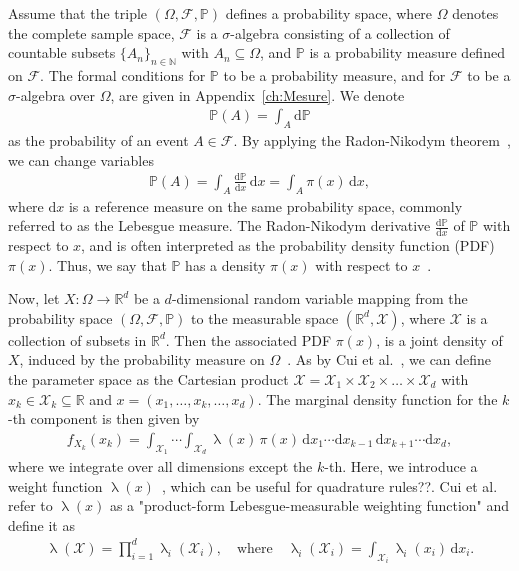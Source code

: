 Assume that the triple $(\Omega, \mathcal{F}, \mathbb{P})$ defines a probability space, where $\Omega$ denotes the complete sample space, $\mathcal{F}$ is a $\sigma$-algebra consisting of a collection of countable subsets $\{A_n\}_{n \in \mathbb{N}}$ with $A_n \subseteq \Omega$, and $\mathbb{P}$ is a probability measure defined on $\mathcal{F}$. The formal conditions for $\mathbb{P}$ to be a probability measure, and for $\mathcal{F}$ to be a $\sigma$-algebra over $\Omega$, are given in Appendix~\ref{ch:Mesure}.
We denote
\begin{align}
	\mathbb{P}(A) = \int_A \mathrm{d} \mathbb{P}
\end{align}
as the probability of an event $A \in \mathcal{F}$.
By applying the Radon-Nikodym theorem~\cite{kopp2004measintprob}, we can change variables
\begin{align}
	\mathbb{P}(A) = \int_A \frac{\mathrm{d} \mathbb{P}}{\mathrm{d}x} \, \mathrm{d}x = \int_A \pi(x) \, \mathrm{d}x,
\end{align}
where $\mathrm{d}x$ is a reference measure on the same probability space, commonly referred to as the Lebesgue measure. 
The Radon-Nikodym derivative $\frac{\mathrm{d} \mathbb{P}}{\mathrm{d}x}$ of $\mathbb{P}$ with respect to $x$, and is often interpreted as the probability density function (PDF) $\pi(x)$. Thus, we say that $\mathbb{P}$ has a density $\pi(x)$ with respect to $x$~\cite[Chapter 10]{simonnet1996measprob}.

Now, let $X: \Omega \longrightarrow \mathbb{R}^d$ be a $d$-dimensional random variable mapping from the probability space $(\Omega, \mathcal{F}, \mathbb{P})$ to the measurable space $(\mathbb{R}^d, \mathcal{X})$, where $\mathcal{X}$ is a collection of subsets in $\mathbb{R}^d$.
Then the associated PDF $\pi(x)$, is a joint density of $X$, induced by the probability measure on $\Omega$~\cite{VesaInvLect, kopp2004measintprob}.
As by Cui et al.~\cite{cui2022deep}, we can define the parameter space as the Cartesian product $\mathcal{X} = \mathcal{X}_1 \times \mathcal{X}_2 \times \dots \times \mathcal{X}_d$ with $ x_k \in \mathcal{X}_k \subseteq \mathbb{R}$ and $x = ( x_1,\dots ,x_k,\dots,x_d )$.
The marginal density function for the $k$-th component is then given by
\begin{align}
	f_{X_k}(x_k) = \int_{\mathcal{X}_1} \cdots \int_{\mathcal{X}_d} \uplambda(x) \, \pi(x) \, \mathrm{d}x_1 \cdots \mathrm{d}x_{k-1} \, \mathrm{d}x_{k+1} \cdots \mathrm{d}x_d,
\end{align}
where we integrate over all dimensions except the $k$-th.
Here, we introduce a weight function $\uplambda(x)$~\cite{davis2007methods}, which can be useful for quadrature rules??. 
Cui et al.~\cite{cui2022deep} refer to $\uplambda(x)$ as a "product-form Lebesgue-measurable weighting function" and define it as
\begin{align*}
	\uplambda(\mathcal{X}) = \prod_{i = 1}^{d} \uplambda_i(\mathcal{X}_i), \quad \text{where} \quad \uplambda_i(\mathcal{X}_i) = \int_{\mathcal{X}_i} \uplambda_i(x_i) \, \mathrm{d}x_i.
\end{align*}

